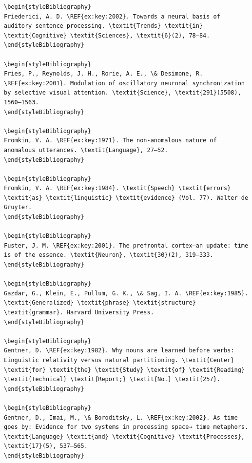 \begin{verbatim}
\begin{styleBibliography}
Friederici, A. D. \REF{ex:key:2002}. Towards a neural basis of auditory sentence processing. \textit{Trends} \textit{in} \textit{Cognitive} \textit{Sciences}, \textit{6}(2), 78–84.
\end{styleBibliography}

\begin{styleBibliography}
Fries, P., Reynolds, J. H., Rorie, A. E., \& Desimone, R. \REF{ex:key:2001}. Modulation of oscillatory neuronal synchronization by selective visual attention. \textit{Science}, \textit{291}(5508), 1560–1563.
\end{styleBibliography}

\begin{styleBibliography}
Fromkin, V. A. \REF{ex:key:1971}. The non-anomalous nature of anomalous utterances. \textit{Language}, 27–52.
\end{styleBibliography}

\begin{styleBibliography}
Fromkin, V. A. \REF{ex:key:1984}. \textit{Speech} \textit{errors} \textit{as} \textit{linguistic} \textit{evidence} (Vol. 77). Walter de Gruyter.
\end{styleBibliography}

\begin{styleBibliography}
Fuster, J. M. \REF{ex:key:2001}. The prefrontal cortex—an update: time is of the essence. \textit{Neuron}, \textit{30}(2), 319–333.
\end{styleBibliography}

\begin{styleBibliography}
Gazdar, G., Klein, E., Pullum, G. K., \& Sag, I. A. \REF{ex:key:1985}. \textit{Generalized} \textit{phrase} \textit{structure} \textit{grammar}. Harvard University Press.
\end{styleBibliography}

\begin{styleBibliography}
Gentner, D. \REF{ex:key:1982}. Why nouns are learned before verbs: Linguistic relativity versus natural partitioning. \textit{Center} \textit{for} \textit{the} \textit{Study} \textit{of} \textit{Reading} \textit{Technical} \textit{Report;} \textit{No.} \textit{257}.
\end{styleBibliography}

\begin{styleBibliography}
Gentner, D., Imai, M., \& Boroditsky, L. \REF{ex:key:2002}. As time goes by: Evidence for two systems in processing space→ time metaphors. \textit{Language} \textit{and} \textit{Cognitive} \textit{Processes}, \textit{17}(5), 537–565.
\end{styleBibliography}


\end{verbatim}
